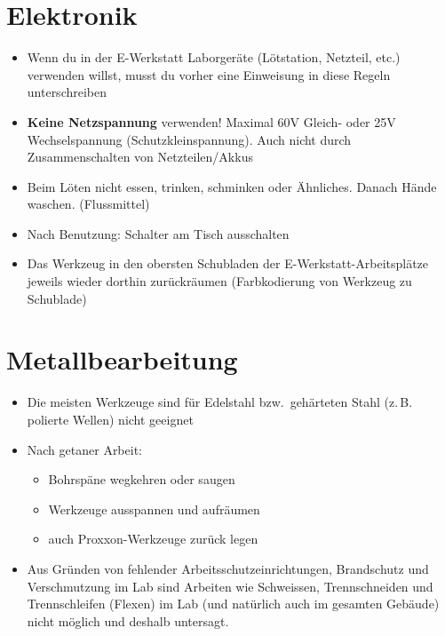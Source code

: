 \documentclass[13pt]{\basedir/fablab-document}
\begin{document}
\vbox{\vspace{0,5cm}}

\section{Elektronik}
\begin{itemize}
  \item Wenn du in der E-Werkstatt Laborgeräte (Lötstation, Netzteil, etc.) verwenden willst, musst du vorher eine Einweisung in diese Regeln unterschreiben
  \item \textbf{Keine Netzspannung} verwenden! Maximal 60V Gleich- oder 25V Wechselspannung (Schutzkleinspannung). Auch nicht durch Zusammenschalten von Netzteilen/Akkus

 \item Beim Löten nicht essen, trinken, schminken oder Ähnliches. Danach Hände waschen. (Flussmittel)
 \item Nach Benutzung: Schalter am Tisch ausschalten
 \item Das Werkzeug in den obersten Schubladen der E-Werkstatt-Arbeitsplätze jeweils wieder dorthin zurückräumen (Farbkodierung von Werkzeug zu Schublade)
\end{itemize}


\section{Metallbearbeitung}
\begin{itemize}
	\item Die meisten Werkzeuge sind für Edelstahl bzw.\  gehärteten Stahl (z.\,B. polierte Wellen) nicht geeignet
	\item Nach getaner Arbeit:
	\begin{itemize}
		\item Bohrspäne wegkehren oder saugen
		\item Werkzeuge ausspannen und aufräumen
		\item auch Proxxon-Werkzeuge zurück legen
	\end{itemize}
	\item Aus Gründen von fehlender Arbeitsschutzeinrichtungen, Brandschutz und Verschmutzung im Lab sind Arbeiten wie Schweissen, Trennschneiden und Trennschleifen (Flexen) im Lab (und natürlich auch im gesamten Gebäude) nicht möglich und deshalb untersagt.
\end{itemize}
\end{document}
